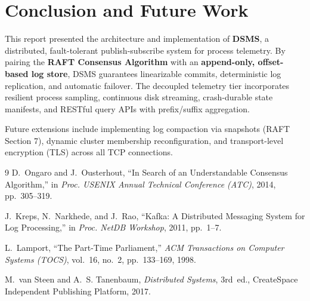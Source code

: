 \documentclass[11pt,a4paper]{article}
\begin{document}
\section{Conclusion and Future Work}
\label{sec:conclusion}
This report presented the architecture and implementation of \textbf{DSMS}, a distributed, fault-tolerant publish-subscribe system for process telemetry. By pairing the \textbf{RAFT Consensus Algorithm} with an \textbf{append-only, offset-based log store}, DSMS guarantees linearizable commits, deterministic log replication, and automatic failover. The decoupled telemetry tier incorporates resilient process sampling, continuous disk streaming, crash-durable state manifests, and RESTful query APIs with prefix/suffix aggregation. 

Future extensions include implementing log compaction via snapshots (RAFT Section 7), dynamic cluster membership reconfiguration, and transport-level encryption (TLS) across all TCP connections.

\begin{thebibliography}{9}
D.~Ongaro and J.~Ousterhout,
``In Search of an Understandable Consensus Algorithm,''
in \emph{Proc. USENIX Annual Technical Conference (ATC)}, 2014, pp.~305--319.

J.~Kreps, N.~Narkhede, and J.~Rao,
``Kafka: A Distributed Messaging System for Log Processing,''
in \emph{Proc. NetDB Workshop}, 2011, pp.~1--7.

L.~Lamport,
``The Part-Time Parliament,''
\emph{ACM Transactions on Computer Systems (TOCS)}, vol.~16, no.~2, pp.~133--169, 1998.

M.~van Steen and A.~S. Tanenbaum,
\emph{Distributed Systems}, 3rd~ed., CreateSpace Independent Publishing Platform, 2017.
\end{thebibliography}
\end{document}
